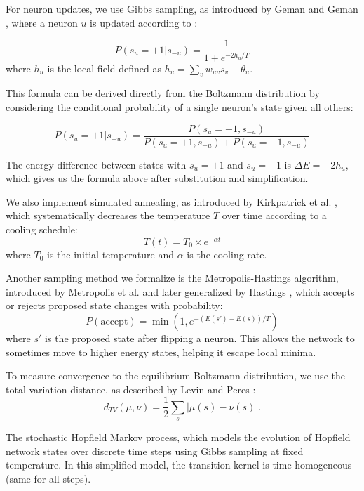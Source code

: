 \begin{definition}\label{GibbsSampling}
\leanok
For neuron updates, we use Gibbs sampling, as introduced by Geman and Geman 
\cite{geman}, where a neuron $u$ is updated according to :

$$P(s_u = +1 | s_{-u}) = \frac{1}{1 + e^{-2h_u/T}}$$
where $h_u$ is the local field defined as $h_u = \sum_v w_{uv}s_v - \theta_u$. 

This formula can be derived directly from the Boltzmann distribution by 
considering the conditional probability of a single neuron's state given all others:

$$P(s_u = +1 | s_{-u}) = \frac{P(s_u = +1, s_{-u})}{P(s_u = +1, s_{-u}) + P(s_u = -1, s_{-u})}$$

The energy difference between states with $s_u = +1$ and $s_u = -1$ 
is $\Delta E = -2h_u$, which gives us the formula above after substitution and simplification.
\end{definition}

\begin{definition}\label{SimulatedAnnealing}
\leanok
We also implement simulated annealing, as introduced by Kirkpatrick et al. \cite{kirk},
which systematically decreases the temperature $T$ over time according to a cooling schedule:
$$T(t) = T_0 \times e^{-\alpha t}$$ where $T_0$ is the initial temperature 
and $\alpha$ is the cooling rate. 
\end{definition}

\begin{definition}\label{Metropolis-Hastings}
\leanok
Another sampling method we formalize is the Metropolis-Hastings algorithm, 
introduced by Metropolis et al. \cite{metropolis} 
and later generalized by Hastings \cite{hastings}, which accepts or rejects 
proposed state changes with probability:
$$P(\text{accept}) = \min(1, e^{-(E(s') - E(s))/T})$$
where $s'$ is the proposed state after flipping a neuron. 
This allows the network to sometimes move to higher energy states, helping it escape local minima.
\end{definition}

\begin{definition}\label{Total variation}
\leanok
To measure convergence to the equilibrium Boltzmann distribution,
 we use the total variation distance, as described by Levin and Peres \cite{levin} : 
$$d_{TV}(\mu, \nu) = \frac{1}{2} \sum_s |\mu(s) - \nu(s)|.$$
\end{definition}

\begin{definition}\label{stochasticHopfieldMarkovProcess}
\leanok
The stochastic Hopfield Markov process, which models the evolution of Hopfield network states
over discrete time steps using Gibbs sampling at fixed temperature.
In this simplified model, the transition kernel is time-homogeneous (same for all steps).
\end{definition}